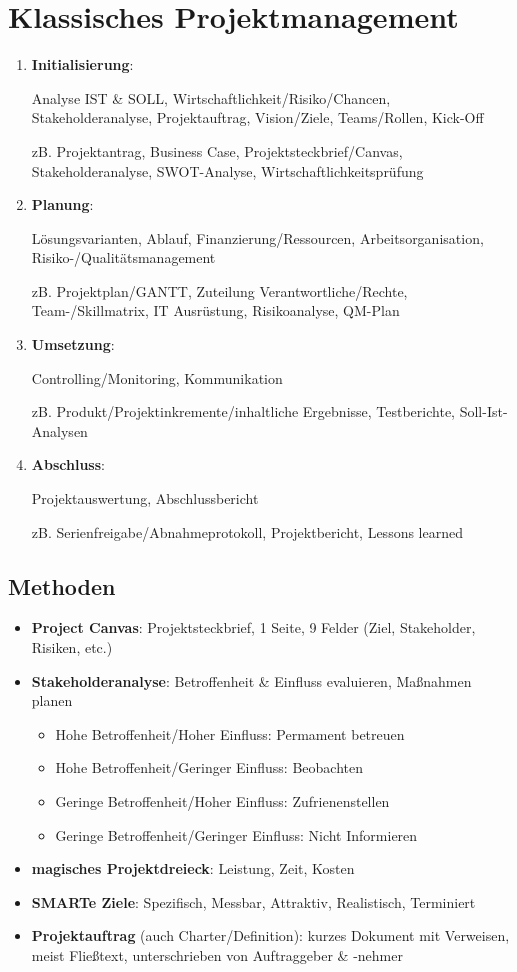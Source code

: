 \documentclass{article}
\begin{document}
\section{Klassisches Projektmanagement}
\begin{enumerate}
  \item \textbf{Initialisierung}:
        \par Analyse IST \& SOLL, Wirtschaftlichkeit/Risiko/Chancen, Stakeholderanalyse, Projektauftrag, Vision/Ziele, Teams/Rollen, Kick-Off
        \par zB. Projektantrag, Business Case, Projektsteckbrief/Canvas, Stakeholderanalyse, SWOT-Analyse, Wirtschaftlichkeitsprüfung
  \item \textbf{Planung}:
        \par Lösungsvarianten, Ablauf, Finanzierung/Ressourcen, Arbeitsorganisation, Risiko-/Qualitätsmanagement
        \par zB. Projektplan/GANTT, Zuteilung Verantwortliche/Rechte, Team-/Skillmatrix, IT Ausrüstung, Risikoanalyse, QM-Plan
  \item \textbf{Umsetzung}:
        \par Controlling/Monitoring, Kommunikation
        \par zB. Produkt/Projektinkremente/inhaltliche Ergebnisse, Testberichte, Soll-Ist-Analysen
  \item \textbf{Abschluss}:
        \par Projektauswertung, Abschlussbericht
        \par zB. Serienfreigabe/Abnahmeprotokoll, Projektbericht, Lessons learned
\end{enumerate}

\subsection{Methoden}

\begin{itemize}
  \item \textbf{Project Canvas}: Projektsteckbrief, 1 Seite, 9 Felder (Ziel, Stakeholder, Risiken, etc.)
  \item \textbf{Stakeholderanalyse}: Betroffenheit \& Einfluss evaluieren, Maßnahmen planen
        \begin{itemize}
          \item Hohe Betroffenheit/Hoher Einfluss: Permament betreuen
          \item Hohe Betroffenheit/Geringer Einfluss: Beobachten
          \item Geringe Betroffenheit/Hoher Einfluss: Zufrienenstellen
          \item Geringe Betroffenheit/Geringer Einfluss: Nicht Informieren
        \end{itemize}
  \item \textbf{magisches Projektdreieck}: Leistung, Zeit, Kosten
  \item \textbf{SMARTe Ziele}: Spezifisch, Messbar, Attraktiv, Realistisch, Terminiert
  \item \textbf{Projektauftrag} (auch Charter/Definition): kurzes Dokument mit Verweisen, meist Fließtext, unterschrieben von Auftraggeber \& -nehmer
\end{itemize}
\end{document}
